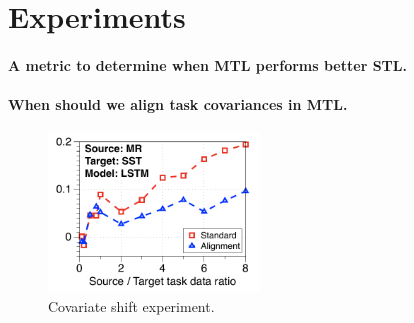 \section{Experiments}

\paragraph{A metric to determine when MTL performs better STL.}

\paragraph{When should we align task covariances in MTL.}
\begin{figure}
	\centering
	\includegraphics[width=0.5\textwidth]{figures/ratio_alignment_mr_sst_lstm.pdf}
	\caption{Covariate shift experiment.}
\end{figure}